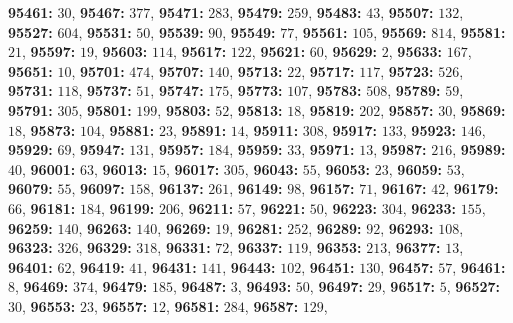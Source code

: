 \textsf{\bfseries 95461:} $30$, \textsf{\bfseries 95467:} $377$, \textsf{\bfseries 95471:} $283$, \textsf{\bfseries 95479:} $259$, \textsf{\bfseries 95483:} $43$, \textsf{\bfseries 95507:} $132$, \textsf{\bfseries 95527:} $604$, \textsf{\bfseries 95531:} $50$, \textsf{\bfseries 95539:} $90$, \textsf{\bfseries 95549:} $77$, \textsf{\bfseries 95561:} $105$, \textsf{\bfseries 95569:} $814$, \textsf{\bfseries 95581:} $21$, \textsf{\bfseries 95597:} $19$, \textsf{\bfseries 95603:} $114$, \textsf{\bfseries 95617:} $122$, \textsf{\bfseries 95621:} $60$, \textsf{\bfseries 95629:} $2$, \textsf{\bfseries 95633:} $167$, \textsf{\bfseries 95651:} $10$, \textsf{\bfseries 95701:} $474$, \textsf{\bfseries 95707:} $140$, \textsf{\bfseries 95713:} $22$, \textsf{\bfseries 95717:} $117$, \textsf{\bfseries 95723:} $526$, \textsf{\bfseries 95731:} $118$, \textsf{\bfseries 95737:} $51$, \textsf{\bfseries 95747:} $175$, \textsf{\bfseries 95773:} $107$, \textsf{\bfseries 95783:} $508$, \textsf{\bfseries 95789:} $59$, \textsf{\bfseries 95791:} $305$, \textsf{\bfseries 95801:} $199$, \textsf{\bfseries 95803:} $52$, \textsf{\bfseries 95813:} $18$, \textsf{\bfseries 95819:} $202$, \textsf{\bfseries 95857:} $30$, \textsf{\bfseries 95869:} $18$, \textsf{\bfseries 95873:} $104$, \textsf{\bfseries 95881:} $23$, \textsf{\bfseries 95891:} $14$, \textsf{\bfseries 95911:} $308$, \textsf{\bfseries 95917:} $133$, \textsf{\bfseries 95923:} $146$, \textsf{\bfseries 95929:} $69$, \textsf{\bfseries 95947:} $131$, \textsf{\bfseries 95957:} $184$, \textsf{\bfseries 95959:} $33$, \textsf{\bfseries 95971:} $13$, \textsf{\bfseries 95987:} $216$, \textsf{\bfseries 95989:} $40$, \textsf{\bfseries 96001:} $63$, \textsf{\bfseries 96013:} $15$, \textsf{\bfseries 96017:} $305$, \textsf{\bfseries 96043:} $55$, \textsf{\bfseries 96053:} $23$, \textsf{\bfseries 96059:} $53$, \textsf{\bfseries 96079:} $55$, \textsf{\bfseries 96097:} $158$, \textsf{\bfseries 96137:} $261$, \textsf{\bfseries 96149:} $98$, \textsf{\bfseries 96157:} $71$, \textsf{\bfseries 96167:} $42$, \textsf{\bfseries 96179:} $66$, \textsf{\bfseries 96181:} $184$, \textsf{\bfseries 96199:} $206$, \textsf{\bfseries 96211:} $57$, \textsf{\bfseries 96221:} $50$, \textsf{\bfseries 96223:} $304$, \textsf{\bfseries 96233:} $155$, \textsf{\bfseries 96259:} $140$, \textsf{\bfseries 96263:} $140$, \textsf{\bfseries 96269:} $19$, \textsf{\bfseries 96281:} $252$, \textsf{\bfseries 96289:} $92$, \textsf{\bfseries 96293:} $108$, \textsf{\bfseries 96323:} $326$, \textsf{\bfseries 96329:} $318$, \textsf{\bfseries 96331:} $72$, \textsf{\bfseries 96337:} $119$, \textsf{\bfseries 96353:} $213$, \textsf{\bfseries 96377:} $13$, \textsf{\bfseries 96401:} $62$, \textsf{\bfseries 96419:} $41$, \textsf{\bfseries 96431:} $141$, \textsf{\bfseries 96443:} $102$, \textsf{\bfseries 96451:} $130$, \textsf{\bfseries 96457:} $57$, \textsf{\bfseries 96461:} $8$, \textsf{\bfseries 96469:} $374$, \textsf{\bfseries 96479:} $185$, \textsf{\bfseries 96487:} $3$, \textsf{\bfseries 96493:} $50$, \textsf{\bfseries 96497:} $29$, \textsf{\bfseries 96517:} $5$, \textsf{\bfseries 96527:} $30$, \textsf{\bfseries 96553:} $23$, \textsf{\bfseries 96557:} $12$, \textsf{\bfseries 96581:} $284$, \textsf{\bfseries 96587:} $129$, 
